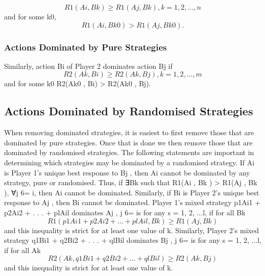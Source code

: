 \documentclass[]{article}
\begin{document}
\[	R1(Ai
	, Bk ) \geq R1(Aj
	, Bk ), k = 1, 2, . . . , n\]
	and for some k0, \[R1(Ai
	, Bk0
	) > R1(Aj
	, Bk0
	).\]
	\subsubsection{Actions Dominated by Pure Strategies}
	Similarly, action Bi of Player 2 dominates action Bj
	if
\[	R2(Ak , Bi) \geq R2(Ak , Bj), k = 1, 2, . . . , m\]
	and for some k0
	R2(Ak0
	, Bi) > R2(Ak0
	, Bj).
	\subsection{Actions Dominated by Randomised Strategies}
	When removing dominated strategies, it is easiest to first remove
	those that are dominated by pure strategies.
	Once that is done we then remove those that are dominated by
	randomised strategies.
	The following statements are important in determining which
	strategies may be dominated by a randomised strategy.
	If Ai
	is Player 1’s unique best response to Bj
	, then Ai cannot be
	dominated by any strategy, pure or randomised.
	Thus, if ∃Bk such that R1(Ai
	, Bk ) > R1(Aj
	, Bk ), ∀j 6= i, then Ai
	cannot be dominated.
	Similarly, if Bi
	is Player 2’s unique best response to Aj
	, then Bi
	cannot be dominated.
	Player 1’s mixed strategy p1Ai1 + p2Ai2 + . . . + plAil
	dominates Aj
	,
	j 6= is for any s = 1, 2, ...l, if for all Bk
	\[R1(p1Ai1 + p2Ai2 + . . . + plAil
	, Bk ) \geq R1(Aj
	, Bk )\]
	and this inequality is strict for at least one value of k.
	Similarly, Player 2’s mixed strategy q1Bi1 + q2Bi2 + . . . + qlBil
	dominates Bj
	, j 6= is for any s = 1, 2, ...l, if for all Ak
	\[R2(Ak , q1Bi1 + q2Bi2 + . . . + qlBil
	) \geq R2(Ak , Bj)\]
	and this inequality is strict for at least one value of k.
\end{document}

